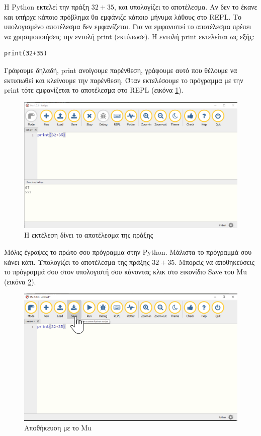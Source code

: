 Η Python εκτελεί την πράξη $32+35$, και υπολογίζει το αποτέλεσμα. Αν δεν το έκανε και υπήρχε κάποιο πρόβλημα θα εμφάνιζε κάποιο μήνυμα λάθους στο REPL. Το υπολογισμένο αποτέλεσμα δεν εμφανίζεται. Για να εμφανιστεί το αποτέλεσμα πρέπει να χρησιμοποιήσεις την εντολή print (εκτύπωσε). Η εντολή print εκτελείται ως εξής:
\begin{lstlisting}
print(32+35)
\end{lstlisting}
Γράφουμε δηλαδή, print ανοίγουμε παρένθεση, γράφουμε αυτό που θέλουμε να εκτυπωθεί και κλείνουμε την παρένθεση. Όταν εκτελέσουμε το πρόγραμμα με την print τότε εμφανίζεται το αποτέλεσμα στο REPL (εικόνα \ref{withprint}).
\begin{figure}
\includegraphics[width=\textwidth]{withprint.png}
\caption{Η εκτέλεση δίνει το αποτέλεσμα της πράξης}
\label{withprint}
\end{figure}
Μόλις έγραψες το πρώτο σου πρόγραμμα στην Python. Μάλιστα το πρόγραμμά σου κάνει κάτι. Υπολογίζει το αποτέλεσμα της πράξης $32+35$.
Μπορείς να αποθηκεύσεις το πρόγραμμά σου στον υπολογιστή σου κάνοντας κλικ στο εικονίδιο Save του Mu (εικόνα \ref{savewithmu}).
\begin{figure}
\includegraphics[width=\textwidth]{save.png}
\caption{Αποθήκευση με το Mu}
\label{savewithmu}
\end{figure}

